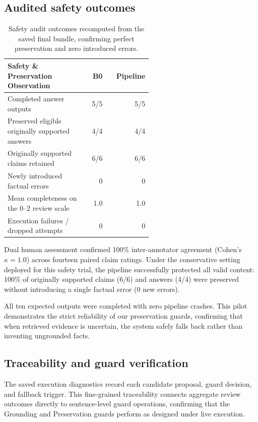 \documentclass[11pt,a4paper]{article}
\newcommand{\code}[1]{\texttt{\detokenize{#1}}}
\begin{document}
\subsection{Audited safety outcomes}
\begin{table}[ht]
\centering
\renewcommand{\arraystretch}{1.35}
\begin{tabular}{p{0.57\linewidth}rr}
\hline
\textbf{Safety \& Preservation Observation} & \textbf{B0} & \textbf{Pipeline}\\\hline
Completed answer outputs & 5/5 & 5/5\\
Preserved eligible originally supported answers & 4/4 & 4/4\\
Originally supported claims retained & 6/6 & 6/6\\
Newly introduced factual errors & 0 & 0\\
Mean completeness on the 0--2 review scale & 1.0 & 1.0\\
Execution failures / dropped attempts & 0 & 0\\\hline
\end{tabular}
\caption{Safety audit outcomes recomputed from the saved final bundle, confirming perfect preservation and zero introduced errors.}
\label{tab:pilot}
\end{table}

Dual human assessment confirmed 100\% inter-annotator agreement (Cohen's $\kappa = 1.0$) across fourteen paired claim ratings. Under the conservative \code{rewrite-only} setting deployed for this safety trial, the pipeline successfully protected all valid content: 100\% of originally supported claims (6/6) and answers (4/4) were preserved without introducing a single factual error (0 new errors). 

All ten expected outputs were completed with zero pipeline crashes. This pilot demonstrates the strict reliability of our preservation guards, confirming that when retrieved evidence is uncertain, the system safely falls back rather than inventing ungrounded facts.

\subsection{Traceability and guard verification}
The saved execution diagnostics record each candidate proposal, guard decision, and fallback trigger. This fine-grained traceability connects aggregate review outcomes directly to sentence-level guard operations, confirming that the Grounding and Preservation guards perform as designed under live execution.
\end{document}
